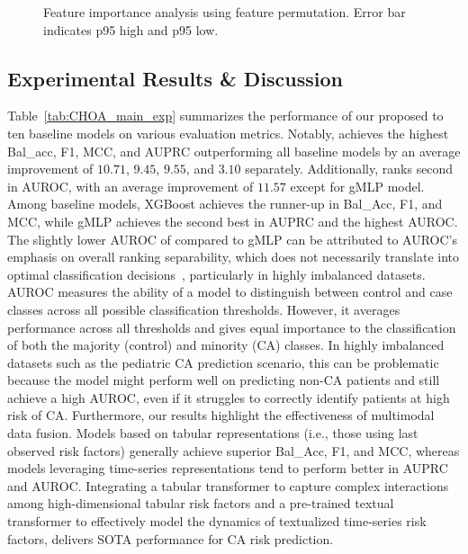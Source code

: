 \begin{figure*}
\centering

\caption{Feature importance analysis using feature permutation. Error bar indicates p95 high and p95 low.}
\label{fig:feat_important}
\vspace{-0.4cm}
\end{figure*}


\subsection{Experimental Results \& Discussion}
Table~\ref{tab:CHOA_main_exp} summarizes the performance of our proposed \modelname to ten baseline models on various evaluation metrics. 
Notably, \modelname achieves the highest Bal\_acc, F1, MCC, and AUPRC outperforming all baseline models by an average improvement of $10.71$, $9.45$, $9.55$, and $3.10$ separately. 
Additionally, \modelname ranks second in AUROC, with an average improvement of $11.57$ except for gMLP model. 
Among baseline models, XGBoost achieves the runner-up in Bal\_Acc, F1, and MCC, while gMLP achieves the second best in AUPRC and the highest AUROC. 
The slightly lower AUROC of \modelname compared to gMLP can be attributed to AUROC's emphasis on overall ranking separability, which does not necessarily translate into optimal classification decisions~\cite{tomavsev2021use}, particularly in highly imbalanced datasets. AUROC measures the ability of a model to distinguish between control and case classes across all possible classification thresholds. However, it averages performance across all thresholds and gives equal importance to the classification of both the majority (control) and minority (CA) classes. In highly imbalanced datasets such as the pediatric CA prediction scenario, this can be problematic because the model might perform well on predicting non-CA patients and still achieve a high AUROC, even if it struggles to correctly identify patients at high risk of CA. 
Furthermore, our results highlight the effectiveness of multimodal data fusion. Models based on tabular representations (i.e., those using last observed risk factors) generally achieve superior Bal\_Acc, F1, and MCC, whereas models leveraging time-series representations tend to perform better in AUPRC and AUROC. Integrating a tabular transformer to capture complex interactions among high-dimensional tabular risk factors and a pre-trained textual transformer to effectively model the dynamics of textualized time-series risk factors, \modelname delivers SOTA performance for CA risk prediction.


